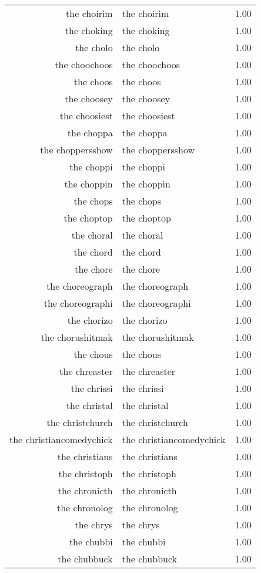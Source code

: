 \begin{table}[ht]
\begin{tabular}{rlr}
  the choirim & the choirim & 1.00 \\ 
  the choking & the choking & 1.00 \\ 
  the cholo & the cholo & 1.00 \\ 
  the choochoos & the choochoos & 1.00 \\ 
  the choos & the choos & 1.00 \\ 
  the choosey & the choosey & 1.00 \\ 
  the choosiest & the choosiest & 1.00 \\ 
  the choppa & the choppa & 1.00 \\ 
  the choppersshow & the choppersshow & 1.00 \\ 
  the choppi & the choppi & 1.00 \\ 
  the choppin & the choppin & 1.00 \\ 
  the chops & the chops & 1.00 \\ 
  the choptop & the choptop & 1.00 \\ 
  the choral & the choral & 1.00 \\ 
  the chord & the chord & 1.00 \\ 
  the chore & the chore & 1.00 \\ 
  the choreograph & the choreograph & 1.00 \\ 
  the choreographi & the choreographi & 1.00 \\ 
  the chorizo & the chorizo & 1.00 \\ 
  the chorushitmak & the chorushitmak & 1.00 \\ 
  the chous & the chous & 1.00 \\ 
  the chreaster & the chreaster & 1.00 \\ 
  the chrissi & the chrissi & 1.00 \\ 
  the christal & the christal & 1.00 \\ 
  the christchurch & the christchurch & 1.00 \\ 
  the christiancomedychick & the christiancomedychick & 1.00 \\ 
  the christians & the christians & 1.00 \\ 
  the christoph & the christoph & 1.00 \\ 
  the chronicth & the chronicth & 1.00 \\ 
  the chronolog & the chronolog & 1.00 \\ 
  the chrys & the chrys & 1.00 \\ 
  the chubbi & the chubbi & 1.00 \\ 
  the chubbuck & the chubbuck & 1.00 \\ 

\end{tabular}
\end{table}
